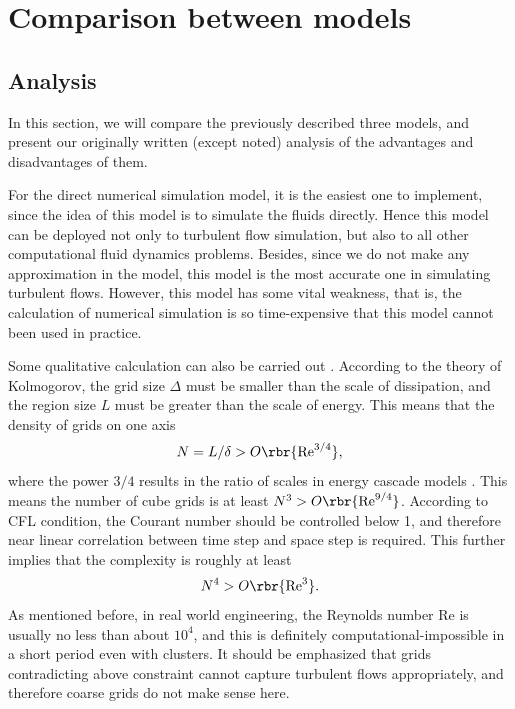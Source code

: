\documentclass[english, nochinese]{pkupaper}
\begin{document}
\section{Comparison between models} \label{Sec:Comp}

\subsection{Analysis}

In this section, we will compare the previously described three models, and present our originally written (except noted)   analysis of the advantages and disadvantages of them.

For the direct numerical simulation model, it is the easiest one to implement, since the idea of this model is to simulate the fluids directly. Hence this model can be deployed not only to turbulent flow simulation, but also to all other computational fluid dynamics problems. Besides, since we do not make any approximation in the model, this model is the most accurate one in simulating turbulent flows. However, this model has some vital weakness, that is, the calculation of numerical simulation is so time-expensive that this model cannot been used in practice.

Some qualitative calculation can also be carried out \parencite{zhaoshun_zhang_theory_2005}. According to the theory of Kolmogorov, the grid size $\Delta$ must be smaller than the scale of dissipation, and the region size $L$ must be greater than the scale of energy. This means that the density of grids on one axis
\begin{equation}
N = L / \delta > O \rbr{ \mathrm{Re}^{ 3 / 4 } } ,
\end{equation}
where the power $ 3 / 4 $ results in the ratio of scales in energy cascade models \parencite{pope_turbulent_2001}. This means the number of cube grids is at least $ N^3 > O \rbr{ \mathrm{Re}^{ 9 / 4 } } $. According to CFL condition, the Courant number should be controlled below 1, and therefore near linear correlation between time step and space step is required. This further implies that the complexity is roughly at least
\begin{equation}
N^4 > O \rbr{ \mathrm{Re}^3 }.
\end{equation}
As mentioned before, in real world engineering, the Reynolds number $\mathrm{Re}$ is usually no less than about $10^4$, and this is definitely computational-impossible in a short period even with clusters. It should be emphasized that grids contradicting above constraint cannot capture turbulent flows appropriately, and therefore coarse grids do not make sense here.
\end{document}
